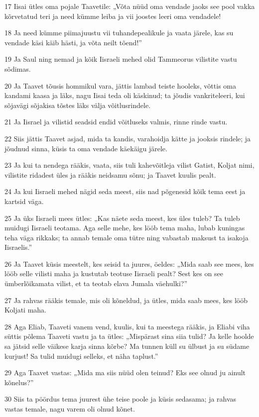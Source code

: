 \par 17 Iisai ütles oma pojale Taavetile: „Võta nüüd oma vendade jaoks see pool vakka kõrvetatud teri ja need kümme leiba ja vii joostes leeri oma vendadele!
\par 18 Ja need kümme piimajuustu vii tuhandepealikule ja vaata järele, kas su vendade käsi käib hästi, ja võta neilt tõend!”
\par 19 Ja Saul ning nemad ja kõik Iisraeli mehed olid Tammeorus vilistite vastu sõdimas.
\par 20 Ja Taavet tõusis hommikul vara, jättis lambad teiste hooleks, võttis oma kandami kaasa ja läks, nagu Iisai teda oli käskinud; ta jõudis vankriteleeri, kui sõjavägi sõjakisa tõstes läks välja võitlusrindele.
\par 21 Ja Iisrael ja vilistid seadsid endid võitluseks valmis, rinne rinde vastu.
\par 22 Siis jättis Taavet asjad, mida ta kandis, varahoidja kätte ja jooksis rindele; ja jõudnud sinna, küsis ta oma vendade käekäigu järele.
\par 23 Ja kui ta nendega rääkis, vaata, siis tuli kahevõitleja vilist Gatist, Koljat nimi, vilistite ridadest üles ja rääkis neidsamu sõnu; ja Taavet kuulis pealt.
\par 24 Ja kui Iisraeli mehed nägid seda meest, siis nad põgenesid kõik tema eest ja kartsid väga.
\par 25 Ja üks Iisraeli mees ütles: „Kas näete seda meest, kes üles tuleb? Ta tuleb muidugi Iisraeli teotama. Aga selle mehe, kes lööb tema maha, lubab kuningas teha väga rikkaks; ta annab temale oma tütre ning vabastab maksust ta isakoja Iisraelis.”
\par 26 Ja Taavet küsis meestelt, kes seisid ta juures, öeldes: „Mida saab see mees, kes lööb selle vilisti maha ja kustutab teotuse Iisraeli pealt? Sest kes on see ümberlõikamata vilist, et ta teotab elava Jumala väehulki?”
\par 27 Ja rahvas rääkis temale, mis oli kõneldud, ja ütles, mida saab mees, kes lööb Koljati maha.
\par 28 Aga Eliab, Taaveti vanem vend, kuulis, kui ta meestega rääkis, ja Eliabi viha süttis põlema Taaveti vastu ja ta ütles: „Mispärast sina siia tulid? Ja kelle hoolde sa jätsid selle väikese karja sinna kõrbe? Ma tunnen küll su ülbust ja su südame kurjust! Sa tulid muidugi selleks, et näha taplust.”
\par 29 Aga Taavet vastas: „Mida ma siis nüüd olen teinud? Eks see olnud ju ainult kõnelus?”
\par 30 Siis ta pöördus tema juurest ühe teise poole ja küsis sedasama; ja rahvas vastas temale, nagu varem oli olnud kõnet.
